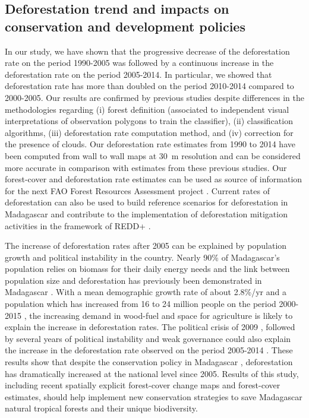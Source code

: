 \documentclass[a4paper, 12pt, leqno]{article} %
\begin{document}
\subsection{Deforestation trend and impacts on conservation and
  development policies}

In our study, we have shown that the progressive decrease of the
deforestation rate on the period 1990-2005 was followed by a
continuous increase in the deforestation rate on the period
2005-2014. In particular, we showed that deforestation rate has more
than doubled on the period 2010-2014 compared to 2000-2005. Our
results are confirmed by previous studies \citep{Harper2007, MEFT2009,
  ONE2015} despite differences in the methodologies regarding (i)
forest definition (associated to independent visual interpretations of
observation polygons to train the classifier), (ii) classification
algorithms, (iii) deforestation rate computation method, and (iv)
correction for the presence of clouds. Our deforestation rate
estimates from 1990 to 2014 have been computed from wall to wall maps
at 30~m resolution and can be considered more accurate in comparison
with estimates from these previous studies. Our forest-cover and
deforestation rate estimates can be used as source of information for
the next FAO Forest Resources Assessment project
\citep{Keenan2015}. Current rates of deforestation can also be used to
build reference scenarios for deforestation in Madagascar and
contribute to the implementation of deforestation mitigation
activities in the framework of REDD+ \citep{Olander2008}.

The increase of deforestation rates after 2005 can be explained by
population growth and political instability in the country. Nearly
90\% of Madagascar's population relies on biomass for their daily
energy needs \citep{Minten2013} and the link between population size
and deforestation has previously been demonstrated in Madagascar
\citep{Vieilledent2013, Gorenflo2011}. With a mean demographic growth
rate of about 2.8\%/yr and a population which has increased from 16 to
24 million people on the period 2000-2015 \citep{UN2015}, the
increasing demand in wood-fuel and space for agriculture is likely to
explain the increase in deforestation rates. The political crisis of
2009 \citep{Ploch2012}, followed by several years of political
instability and weak governance could also explain the increase in the
deforestation rate observed on the period 2005-2014
\citep{Smith2003}. These results show that despite the conservation
policy in Madagascar \citep{Freudenberger2010}, deforestation has
dramatically increased at the national level since 2005. Results of
this study, including recent spatially explicit forest-cover change
maps and forest-cover estimates, should help implement new
conservation strategies to save Madagascar natural tropical forests
and their unique biodiversity.
\end{document}
